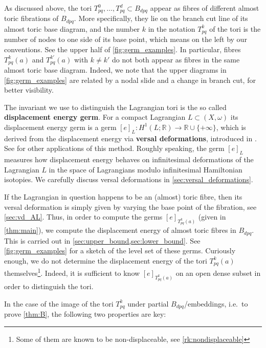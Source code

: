 \documentclass[12pt,a4paper,abstract=true,final]{scrartcl}
\begin{document}
As discussed above, the tori $T^0_{pq}, \ldots , T^d_{pq} \subset B_{dpq}$ appear as fibres of different almost toric fibrations of $B_{dpq}$.
More specifically, they lie on the branch cut line of its almost toric base diagram, and the number $k$ in the notation $T^k_{pq}$ of the tori is the number of nodes to one side of its base point, which means on the left by our conventions. See the upper half of \cref{fig:germ_examples}.
In particular, fibres $T^k_{pq}(a)$ and $T^{k'}_{pq}(a)$ with $k \neq k'$ do not both appear as fibres in the same almost toric base diagram.
Indeed, we note that the upper diagrams in \cref{fig:germ_examples} are related by a nodal slide and a change in branch cut, for better visibility.

\medskip

The invariant we use to distinguish the Lagrangian tori is the so called \textbf{displacement energy germ}.
For a compact Lagrangian $L \subset (X,\omega)$ its displacement energy germ is a germ $[e]_L \colon H^1(L;\mathbb{R}) \rightarrow \mathbb{R} \cup \{+\infty\}$, which is derived from  the displacement energy via \textbf{versal deformations}, introduced in \cite{Che96}. See \cite{brendel2020real,brendel2023local,CheSch10} for other applications of this method.
Roughly speaking, the germ $[e]_L$ measures how displacement energy behaves on infinitesimal deformations of the Lagrangian $L$ in the space of Lagrangians modulo infinitesimal Hamiltonian isotopies.
We carefully discuss versal deformations in \cref{sec:versal_deformations}. 

If the Lagrangian in question happens to be an (almost) toric fibre, then its versal deformation is simply given by varying the base point of the fibration, see \cref{sec:vd_AL}. Thus, in order to compute the germs $[e]_{T^k_{pq}(a)}$ (given in \cref{thm:main}), we compute the displacement energy of almost toric fibres in $B_{dpq}$. This is carried out in \cref{sec:upper_bound,sec:lower_bound}. See \cref{fig:germ_examples} for a sketch of the level set of these germs. Curiously enough, we do not determine the displacement energy of the tori $T^{k}_{pq}(a)$ themselves\footnote{Some of them are known to be non-displaceable, see \cref{rk:nondisplaceable}}. Indeed, it is sufficient to know $[e]_{T^k_{pq}(a)}$ on an open dense subset in order to distinguish the tori. 

In the case of the image of the tori $T^k_{pq}$ under partial $B_{dpq}$\-/embeddings, i.e.\ to prove \cref{thm:B}, the following two properties are key:
\end{document}

